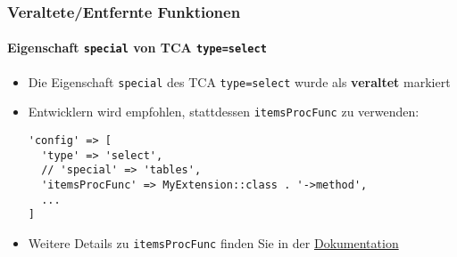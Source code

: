 %

\begin{frame}[fragile]
	\frametitle{Veraltete/Entfernte Funktionen}
	\framesubtitle{Eigenschaft \texttt{special} von TCA \texttt{type=select}}


	\begin{itemize}
		\item Die Eigenschaft \texttt{special} des TCA \texttt{type=select}
			wurde als \textbf{veraltet} markiert
		\item Entwicklern wird empfohlen, stattdessen \texttt{itemsProcFunc} zu verwenden:
\begin{lstlisting}
'config' => [
  'type' => 'select',
  // 'special' => 'tables',
  'itemsProcFunc' => MyExtension::class . '->method',
  ...
]
\end{lstlisting}

		\item Weitere Details zu \texttt{itemsProcFunc} finden Sie in der
		 	\href{https://docs.typo3.org/m/typo3/reference-tca/master/en-us/ColumnsConfig/CommonProperties/ItemsProcFunc.html}{Dokumentation}
	\end{itemize}

\end{frame}

